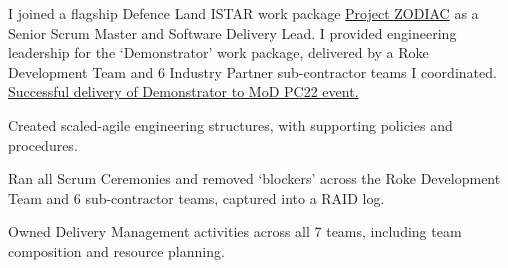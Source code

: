I joined a flagship Defence Land ISTAR work package \href{https://www.roke.co.uk/news/digitising-land-tactical-istar}{Project ZODIAC} as a Senior Scrum Master and Software Delivery Lead. I provided engineering leadership for the `Demonstrator' work package, delivered by a Roke Development Team and 6 Industry Partner sub-contractor teams I coordinated. \href{https://www.roke.co.uk/news-discover-the-latest-news-and-press-releases-roke/british-army-trusts-roke-to-deliver-40m-contract-for-the-next-phase-of-project-zodiac}{Successful delivery of Demonstrator to MoD PC22 event.} %
\vspace{0.25em}
\begin{tightemize}
  \item Created scaled-agile engineering structures, with supporting policies and procedures.
  \item Ran all Scrum Ceremonies and removed `blockers' across the Roke Development Team and 6 sub-contractor teams, captured into a RAID log.
  \item Owned Delivery Management activities across all 7 teams, including team composition and resource planning.
\end{tightemize}
\sectionsep{}
\vfill{}
